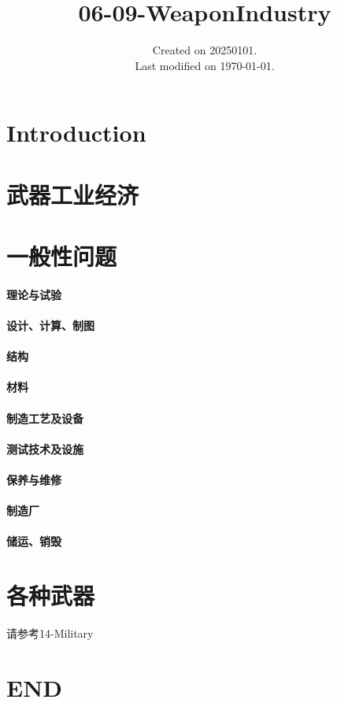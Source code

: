 \documentclass[UTF8]{../../ApplicationUniverse}
\begin{document}
\title{06-09-WeaponIndustry}
\date{Created on 20250101.\\   Last modified on \today.}
\maketitle
\tableofcontents


\chapter{Introduction}

 

\chapter{武器工业经济}




\chapter{一般性问题}
\subsubsection{理论与试验}
\subsubsection{设计、计算、制图}
\subsubsection{结构}
\subsubsection{材料}
\subsubsection{制造工艺及设备}
\subsubsection{测试技术及设施}
\subsubsection{保养与维修}
\subsubsection{制造厂}
\subsubsection{储运、销毁}


\chapter{各种武器} %

请参考14-Military




\chapter{END}
\end{document}
